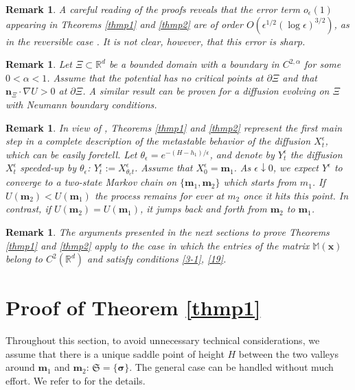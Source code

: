 \documentclass[reqno]{amsart}
\newtheorem{remark}[theorem]{Remark}
\newcounter{as}[section]
\newcommand{\mf}[1]{{\mathfrak #1}}
\newcommand{\bb}[1]{{\mathbb #1}}
\newcommand{\bs}[1]{{\boldsymbol #1}}
\newcommand{\<}{\langle}
\renewcommand{\>}{\rangle}
\begin{document}
\begin{remark}
\label{rem53}
A careful reading of the proofs reveals that the error term
$o_\epsilon (1)$ appearing in Theorems \ref{thmp1} and \ref{thmp2} are
of order $O(\epsilon^{1/2}(\log \epsilon)^{3/2})$, as in the
reversible case \cite{BEGK1}. It is not clear, however, that this error is sharp.
\end{remark}


\begin{remark}
  Let $\Xi \subset \bb R^d$ be a bounded domain with a boundary in
  $C^{2,\alpha}$ for some $0<\alpha<1$. Assume that the potential has
  no critical points at $\partial \Xi$ and that $\bs n_\Xi \cdot
  \nabla U >0$ at $\partial \Xi$.  A similar result can be proven for
  a diffusion evolving on $\Xi$ with Neumann boundary conditions.
\end{remark}

\begin{remark}
\label{rm11}
In view of \cite{BL1, BL2}, Theorems \ref{thmp1} and \ref{thmp2}
represent the first main step in a complete description of the
metastable behavior of the diffusion $X^\epsilon_t$, which can be
easily foretell. Let $\theta_\epsilon = e^{-(H-h_1)/\epsilon}$, and
denote by $Y^\epsilon_t$ the diffusion $X^\epsilon_{t}$ speeded-up by
$\theta_\epsilon$: $Y^\epsilon_t:= X^\epsilon_{\theta_\epsilon t}$.
Assume that $X^\epsilon_0 = \bs m_1$. As $\epsilon \downarrow 0$, we
expect $Y^\epsilon$ to converge to a two-state Markov chain on $\{\bs
m_1,\bs m_2\}$ which starts from $m_1$. If $U(\bs m_2) < U(\bs m_1)$
the process remains for ever at $m_2$ once it hits this point. In
contrast, if $U(\bs m_2) = U(\bs m_1)$, it jumps back and forth from
$\bs m_2$ to $\bs m_1$.
\end{remark}

\begin{remark}
  The arguments presented in the next sections to prove Theorems
  \ref{thmp1} and \ref{thmp2} apply to the case in which the entries
  of the matrix $\bb M (\bs x)$ belong to $C^2(\bb R^d)$ and satisfy
  conditions \eqref{3-1}, \eqref{19}.
\end{remark}




\section{Proof of Theorem \ref{thmp1}}
\label{sec4}

Throughout this section, to avoid unnecessary technical
considerations, we assume that there is a unique saddle point of
height $H$ between the two valleys around $\bs{m}_{1}$ and
$\bs{m}_{2}$: $\mf{S}=\{\bs{\sigma}\}$. The general case can be
handled without much effort. We refer to \cite{LS1} for the details.
\end{document}

